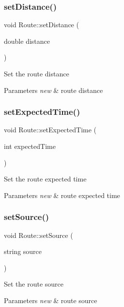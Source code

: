 \subsubsection{\texorpdfstring{set\+Distance()}{setDistance()}}
{\footnotesize\ttfamily void Route\+::set\+Distance (\begin{DoxyParamCaption}\item[{double}]{distance }\end{DoxyParamCaption})}

Set the route distance 
\begin{DoxyParams}{Parameters}
{\em new} & route distance \\
\hline
\end{DoxyParams}
\hypertarget{classRoute_a437920d776b005e425df9c5cfc5de450}{}\label{classRoute_a437920d776b005e425df9c5cfc5de450} 
\subsubsection{\texorpdfstring{set\+Expected\+Time()}{setExpectedTime()}}
{\footnotesize\ttfamily void Route\+::set\+Expected\+Time (\begin{DoxyParamCaption}\item[{int}]{expected\+Time }\end{DoxyParamCaption})}

Set the route expected time 
\begin{DoxyParams}{Parameters}
{\em new} & route expected time \\
\hline
\end{DoxyParams}
\hypertarget{classRoute_ad39247fcbd404ef5755262e0c1cae04d}{}\label{classRoute_ad39247fcbd404ef5755262e0c1cae04d} 
\subsubsection{\texorpdfstring{set\+Source()}{setSource()}}
{\footnotesize\ttfamily void Route\+::set\+Source (\begin{DoxyParamCaption}\item[{string}]{source }\end{DoxyParamCaption})}

Set the route source 
\begin{DoxyParams}{Parameters}
{\em new} & route source \\
\hline
\end{DoxyParams}
\hypertarget{classRoute_a2e6b5b3d06829495c0db27b63c9cf3a4}{}\label{classRoute_a2e6b5b3d06829495c0db27b63c9cf3a4} 
